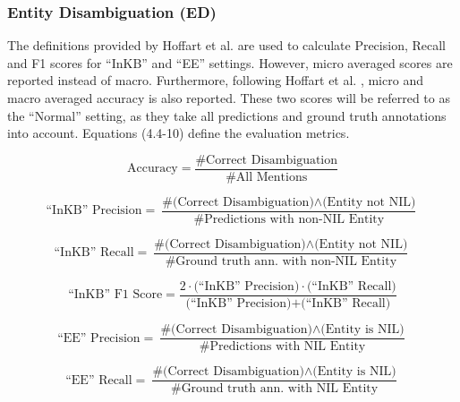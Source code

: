 \documentclass{report}
\theoremstyle{definition}
\theoremstyle{remark}
\begin{document}
\subsubsection{Entity Disambiguation (ED)}
The definitions provided by Hoffart et al. \cite{NILMentions} are used to calculate Precision, Recall and F1 scores for ``InKB'' and ``EE'' settings. However, micro averaged scores are reported instead of macro. Furthermore, following Hoffart et al. \cite{NILMentions}, micro and macro averaged accuracy is also reported. These two scores will be referred to as the ``Normal'' setting, as they take all predictions and ground truth annotations into account. Equations (4.4-10) define the evaluation metrics.
\begin{fleqn}
\begin{equation}
    \text{Accuracy} = \frac{\text{\# Correct Disambiguation}}{\text{\# All Mentions}}
\end{equation}
\end{fleqn}
\begin{fleqn}
\begin{equation}
    \text{``InKB'' Precision} = \frac{\text{\# (Correct Disambiguation)} \land \text{(Entity not NIL)}}{\text{\# Predictions with non-NIL Entity}}
\end{equation}
\end{fleqn}
\begin{fleqn}
\begin{equation}
    \text{``InKB'' Recall} = \frac{\text{\# (Correct Disambiguation)} \land \text{(Entity not NIL)}}{\text{\# Ground truth ann. with non-NIL Entity}}
\end{equation}
\end{fleqn}
\begin{fleqn}
\begin{equation}
    \text{``InKB'' F1 Score} = \frac{2 \cdot \text{(``InKB'' Precision)} \cdot \text{(``InKB'' Recall)}}{\text{(``InKB'' Precision)} + \text{(``InKB'' Recall)}}
\end{equation}
\end{fleqn}

\begin{fleqn}
\begin{equation}
    \text{``EE'' Precision} = \frac{\text{\# (Correct Disambiguation)} \land \text{(Entity is NIL)}}{\text{\# Predictions with NIL Entity}}
\end{equation}
\end{fleqn}

\begin{fleqn}
\begin{equation}
    \text{``EE'' Recall} = \frac{\text{\# (Correct Disambiguation)} \land \text{(Entity is NIL)}}{\text{\# Ground truth ann. with NIL Entity}}
\end{equation}
\end{fleqn}
\end{document}
